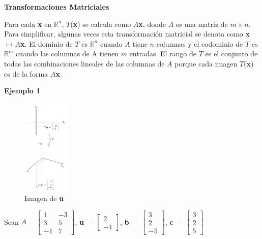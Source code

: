 \documentclass[12 pt]{article}
\begin{document}
\begin{large}
    \textbf{Transformaciones Matriciales}
\end{large}

Para cada \textbf{x} en $\mathbb{R}^n$, $T$(\textbf{x}) se calcula como $A$\textbf{x}, donde $A$ es una matriz de $m \times n$. Para simplificar, algunas veces esta transformación matricial se denota como \textbf{x} $\longmapsto A$\textbf{x}. El dominio de $T$ es $\mathbb{R}^n$ cuando $A$ tiene $n$ columnas y el codominio de $T$ es $\mathbb{R}^m$ cuando las columnas de A tienen $m$ entradas. El rango de $T$ es el conjunto de todas las combinaciones lineales de las columnas de $A$ porque cada imagen $T$(\textbf{x}) es de la forma $A$\textbf{x}.

\begin{large}
    \textbf{Ejemplo 1}
\end{large}

\begin{figure} 
    \centering
    \includegraphics[width=0.2\textwidth]{image18.png}
    \caption{Imagen de \textbf{u}}
\end{figure}

Sean $A = \left[\begin{array}{rr}
    1 & -3 \\ 3 & 5 \\ -1 & 7
\end{array}\right]$, \textbf{u} $= \left[\begin{array}{r} 2 \\-1 \end{array} \right]$, \textbf{b} $= \left[\begin{array}{r} 3 \\ 2 \\ -5 \end{array} \right]$, \textbf{c} $= \begin{bmatrix} 3 \\ 2 \\5 \end{bmatrix}$  
\end{document}
